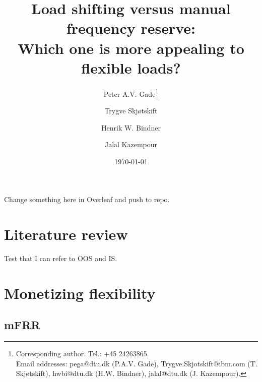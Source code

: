 \documentclass[11pt,a4paper]{article}
\begin{document}
\title{
    Load shifting versus manual frequency reserve: \\ Which one is more appealing to flexible loads?
}
\author[1,2]{Peter A.V. Gade\footnote{Corresponding author. Tel.: +45 24263865. \\ Email addresses: pega@dtu.dk (P.A.V. Gade), Trygve.Skjotskift@ibm.com (T. Skjøtskift), hwbi@dtu.dk (H.W. Bindner), jalal@dtu.dk (J. Kazempour).}}
\author[2]{Trygve Skjøtskift}
\author[1]{Henrik W. Bindner}
\author[1]{Jalal Kazempour}
\renewcommand\Affilfont{\itshape\small}

\date{\today}
{\let\newpage\relax\maketitle}

\tableofcontents

\newpage

\printglossary[type=type1, nonumberlist]
\printglossary[type=type2, nonumberlist]
\glsenablehyper




Change something here in Overleaf and push to repo.



\section{Literature review}

Test that I can refer to \gls{OOS} and \gls{IS}.

\section{Monetizing flexibility}

\subsection{mFRR}
\end{document}
